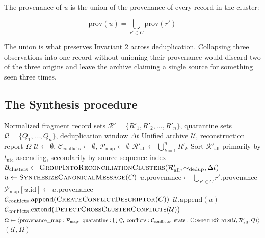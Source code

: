 The provenance of $u$ is the union of the provenance of every record in the
cluster:

\begin{equation}
  \mathrm{prov}(u) = \bigcup_{r' \in C} \mathrm{prov}(r')
  \label{eq:provunion}
\end{equation}

The union is what preserves Invariant 2 across deduplication. Collapsing three
observations into one record without unioning their provenance would discard two
of the three origins and leave the archive claiming a single source for something
seen three times.

\subsection{The Synthesis procedure}
\label{sec:algorithms:procedure}

\begin{algorithm}[htbp]
\caption{CARTA Synthesis and Audit Report Construction}
\label{alg:carta_synthesis}
\begin{algorithmic}[1]
\Require Normalized fragment record sets
  $\mathcal{R}' = \{R'_1, R'_2, \dots, R'_n\}$,
  quarantine sets $\mathcal{Q} = \{Q_1, \dots, Q_n\}$,
  deduplication window $\Delta t$
\Ensure Unified archive $\mathcal{U}$, reconstruction report $\Omega$
\State $\mathcal{U} \leftarrow \emptyset$,
       $\mathcal{C}_{\text{conflicts}} \leftarrow \emptyset$,
       $\mathcal{P}_{\text{map}} \leftarrow \emptyset$
\State $\mathcal{R}'_{\text{all}} \leftarrow \bigcup_{k=1}^n R'_k$
\State Sort $\mathcal{R}'_{\text{all}}$ primarily by $t_{\text{utc}}$ ascending,
       secondarily by source sequence index
\State $\mathcal{B}_{\text{clusters}} \leftarrow
       \textsc{GroupIntoReconciliationClusters}(
         \mathcal{R}'_{\text{all}}, \sim_{\text{dedup}}, \Delta t)$
    \State $u \leftarrow \textsc{SynthesizeCanonicalMessage}(C)$
    \State $u.\text{provenance} \leftarrow
           \bigcup_{r' \in C} r'.\text{provenance}$
    \State $\mathcal{P}_{\text{map}}[u.\text{id}] \leftarrow u.\text{provenance}$
        \State $\mathcal{C}_{\text{conflicts}}.\text{append}(
               \textsc{CreateConflictDescriptor}(C))$
    \EndIf
    \State $\mathcal{U}.\text{append}(u)$
\EndFor
\State $\mathcal{C}_{\text{conflicts}}.\text{extend}(
       \textsc{DetectCrossClusterConflicts}(\mathcal{U}))$
\State $\Omega \leftarrow \big\langle
       \text{provenance\_map}: \mathcal{P}_{\text{map}},\;
       \text{quarantine}: \bigcup \mathcal{Q},\;
       \text{conflicts}: \mathcal{C}_{\text{conflicts}},\;
       \text{stats}: \textsc{ComputeStats}(
         \mathcal{U}, \mathcal{R}'_{\text{all}}, \mathcal{Q}) \big\rangle$
\State \Return $(\mathcal{U}, \Omega)$
\end{algorithmic}
\end{algorithm}

